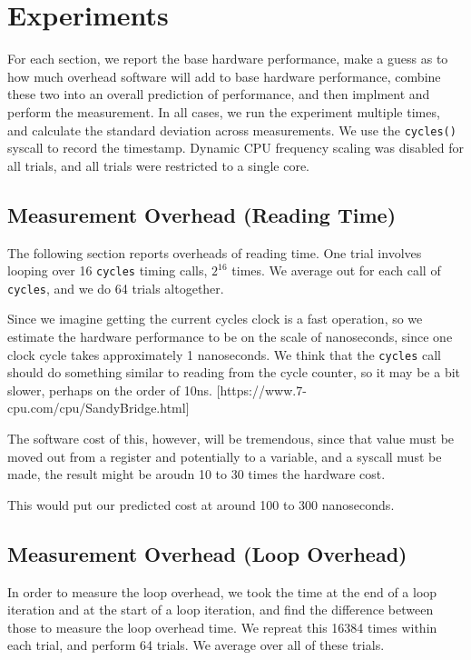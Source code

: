 \documentclass[letterpaper,twocolumn,10pt]{article}
\begin{document}
\section{Experiments}

For each section, we report the base hardware performance, make a guess as to how much overhead software will add to base hardware performance, combine these two into an overall prediction of performance, and then implment and perform the measurement. In all cases, we run the experiment multiple times, and calculate the standard deviation across measurements. We use the \texttt{cycles()} syscall to record the timestamp. Dynamic CPU frequency scaling was disabled for all trials, and all trials were restricted to a single core.

\subsection{Measurement Overhead (Reading Time)}

The following section reports overheads of reading time. One trial involves looping over 16 \texttt{cycles} timing calls, $2^{16}$ times. We average out for each call of \texttt{cycles}, and we do 64 trials altogether.

Since we imagine getting the current cycles clock is a fast operation, so we
estimate the hardware performance to be on the scale of nanoseconds, since one
clock cycle takes approximately 1 nanoseconds. We think that the
\texttt{cycles} call should do something similar to reading from the cycle
counter, so it may be a bit slower, perhaps on the order of 10ns.
[https://www.7-cpu.com/cpu/SandyBridge.html]

The software cost of this, however, will be tremendous, since that value must
be moved out from a register and potentially to a variable, and a syscall must
be made, the result might be aroudn 10 to 30 times the hardware cost.

This would put our predicted cost at around 100 to 300 nanoseconds.

\subsection{Measurement Overhead (Loop Overhead)}

In order to measure the loop overhead, we took the time at the end of a loop
iteration and at the start of a loop iteration, and find the difference between
those to measure the loop overhead time. We repreat this 16384 times within
each trial, and perform 64 trials. We average over all of these trials.
\end{document}
